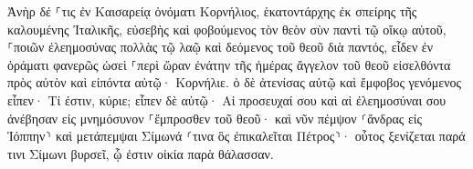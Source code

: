 \documentclass{openreader}
\begin{document}
Ἀνὴρ δέ ⸀τις ἐν Καισαρείᾳ ὀνόματι Κορνήλιος, ἑκατοντάρχης ἐκ σπείρης τῆς καλουμένης Ἰταλικῆς, 
εὐσεβὴς καὶ φοβούμενος τὸν θεὸν σὺν παντὶ τῷ οἴκῳ αὐτοῦ, ⸀ποιῶν ἐλεημοσύνας πολλὰς τῷ λαῷ καὶ δεόμενος τοῦ θεοῦ διὰ παντός, 
εἶδεν ἐν ὁράματι φανερῶς ὡσεὶ ⸀περὶ ὥραν ἐνάτην τῆς ἡμέρας ἄγγελον τοῦ θεοῦ εἰσελθόντα πρὸς αὐτὸν καὶ εἰπόντα αὐτῷ· Κορνήλιε. 
ὁ δὲ ἀτενίσας αὐτῷ καὶ ἔμφοβος γενόμενος εἶπεν· Τί ἐστιν, κύριε; εἶπεν δὲ αὐτῷ· Αἱ προσευχαί σου καὶ αἱ ἐλεημοσύναι σου ἀνέβησαν εἰς μνημόσυνον ⸀ἔμπροσθεν τοῦ θεοῦ· 
καὶ νῦν πέμψον ⸂ἄνδρας εἰς Ἰόππην⸃ καὶ μετάπεμψαι Σίμωνά ⸂τινα ὃς ἐπικαλεῖται Πέτρος⸃· 
οὗτος ξενίζεται παρά τινι Σίμωνι βυρσεῖ, ᾧ ἐστιν οἰκία παρὰ θάλασσαν. 
\end{document}
